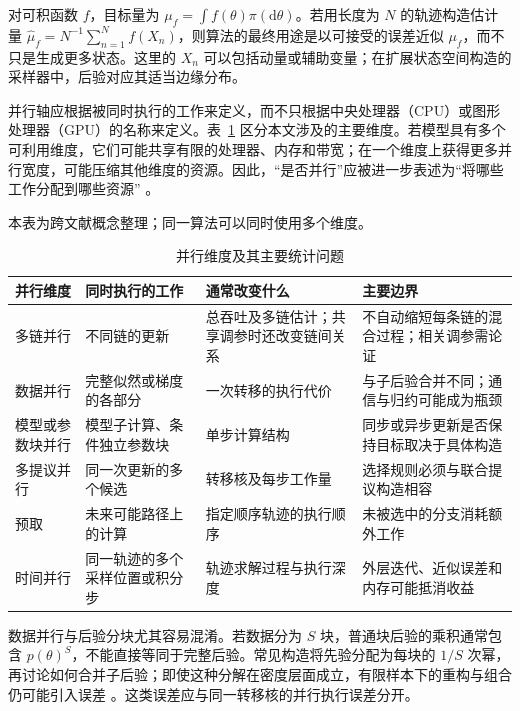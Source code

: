 \documentclass[UTF8,a4paper,zihao=-4,fontset=fandol]{ctexart}
\begin{document}
对可积函数 $f$，目标量为 $\mu_f=\int f(\theta)\pi(\mathrm d\theta)$。若用长度为 $N$ 的轨迹构造估计量 $\widehat\mu_f=N^{-1}\sum_{n=1}^{N}f(X_n)$，则算法的最终用途是以可接受的误差近似 $\mu_f$，而不只是生成更多状态。这里的 $X_n$ 可以包括动量或辅助变量；在扩展状态空间构造的采样器中，后验对应其适当边缘分布。

并行轴应根据被同时执行的工作来定义，而不只根据中央处理器（CPU）或图形处理器（GPU）的名称来定义。表~\ref{tab:1} 区分本文涉及的主要维度。若模型具有多个可利用维度，它们可能共享有限的处理器、内存和带宽；在一个维度上获得更多并行宽度，可能压缩其他维度的资源。因此，“是否并行”应被进一步表述为“将哪些工作分配到哪些资源” \cite{sountsov2026}。

\begin{table}[htbp]
\centering{}
\caption{并行维度及其主要统计问题}\label{tab:1}
\parbox{\linewidth}{\footnotesize 本表为跨文献概念整理；同一算法可以同时使用多个维度。}\par\smallskip
\begin{tabular}{@{}>{\raggedright\arraybackslash}p{}>{\raggedright\arraybackslash}p{}>{\raggedright\arraybackslash}p{}>{\raggedright\arraybackslash}p{}@{}}
\toprule
并行维度 & 同时执行的工作 & 通常改变什么 & 主要边界 \\
\midrule
多链并行 & 不同链的更新 & 总吞吐及多链估计；共享调参时还改变链间关系 & 不自动缩短每条链的混合过程；相关调参需论证 \\[4pt]
数据并行 & 完整似然或梯度的各部分 & 一次转移的执行代价 & 与子后验合并不同；通信与归约可能成为瓶颈 \\[4pt]
模型或参数块并行 & 模型子计算、条件独立参数块 & 单步计算结构 & 同步或异步更新是否保持目标取决于具体构造 \\[4pt]
多提议并行 & 同一次更新的多个候选 & 转移核及每步工作量 & 选择规则必须与联合提议构造相容 \\[4pt]
预取 & 未来可能路径上的计算 & 指定顺序轨迹的执行顺序 & 未被选中的分支消耗额外工作 \\[4pt]
时间并行 & 同一轨迹的多个采样位置或积分步 & 轨迹求解过程与执行深度 & 外层迭代、近似误差和内存可能抵消收益 \\[4pt]
\bottomrule
\end{tabular}
\end{table}

数据并行与后验分块尤其容易混淆。若数据分为 $S$ 块，普通块后验的乘积通常包含 $p(\theta)^S$，不能直接等同于完整后验。常见构造将先验分配为每块的 $1/S$ 次幂，再讨论如何合并子后验；即使这种分解在密度层面成立，有限样本下的重构与组合仍可能引入误差 \cite{angelino2016,bardenet2017}。这类误差应与同一转移核的并行执行误差分开。
\end{document}
